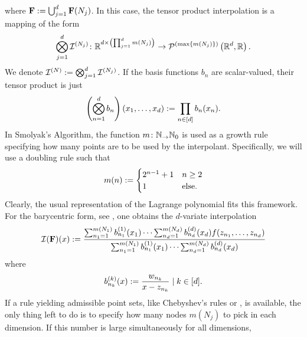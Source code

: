 \documentclass[12pt, oneside]{amsart}
\theoremstyle{definition}
\theoremstyle{remark}
\numberwithin{equation}{section}
\begin{document}
where \(\FF \defn \bigcup_{j=1}^d \FF(N_j)\).  %
In this case, the tensor product 
interpolation is a mapping of the form
\begin{equation}\label{eq:tensorProdInterpMappingSpecification}
    \bigotimes_{j=1}^d \cI^{(N_j)}\from \R^{d \times \left(\prod_{j=1}^d 
    m(N_j) \right)} \to \pols[\left(\max \set{m(N_j)} \right)]{\R^d, \R}.
\end{equation}
We denote \(\cI^{(N)} \defn \bigotimes_{j=1}^d \cI^{(N_j)}\). If the basis functions \(b_n\) are scalar-valued, their tensor product is just
\begin{equation}\label{eq:tensorProdFunc}
    \left( \bigotimes_{n=1}^d b_n \right)(x_1, \dots, x_d) \defn \prod_{n \in [d]} b_n(x_n).
\end{equation}
In Smolyak's Algorithm, the function \(m\from \N_ \to \N_0\) is used as a 
growth 
rule specifying how many points are to be used by the interpolant. 
Specifically, we will use a doubling rule such that
\[
    m(n) \defn \begin{cases}
        2^{n-1}+1 &n \geq 2\\
        1 &\text{else}.
    \end{cases}
\]
Clearly, the usual representation of the Lagrange polynomial 
 fits this framework. For the barycentric form, 
see \cite{Berut_2004}, one obtains the \(d\)-variate interpolation
\begin{equation}\label{eq:multivarBarycentric} %
    \cI(\FF)(x) \defn \frac{\sum_{n_1=1}^{m(N_1)} b^{(1)}_{n_1}(x_1) \cdots \sum_{n_d=1}^{m(N_d)}b^{(d)}_{n_d}(x_d) f(z_{n_1}, \dots, z_{n_d})}{\sum_{n_1=1}^{m(N_1)} b^{(1)}_{n_1}(x_1) \cdots \sum_{n_d=1}^{m(N_d)}b^{(d)}_{n_d}(x_d)}
\end{equation}
where
\begin{equation}\label{eq:barycentricBasis}
    b^{(k)}_{n_k}(x) \defn \frac{w_{n_k}}{x-z_{n_k}} \mid k \in [d].
\end{equation}
If a rule yielding admissible point sets, like Chebyshev's rules 
 or , is available, the only thing 
left to do is to specify how many nodes $m(N_j)$ to pick in each 
dimension. If this number is large simultaneously for all dimensions,
\end{document}
